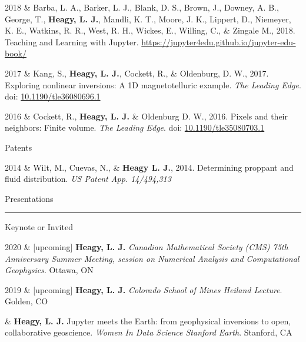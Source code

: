 \documentclass[a4paper, 11pt]{article}
\newcommand{\doi}[1]{doi: \href{https://doi.org/#1}{#1}}
\newcommand{\heading}[1]{
    \begin{minipage}[t]{\textwidth}
    \vspace{0.05cm}
    {\LARGE #1}\\
    \vspace{-0.24cm}
    \hrule
    \end{minipage}
    \vspace{0.05cm}

}
\newcommand{\subheading}[1]{
    \vspace{0.4cm}
    {\Large #1}\\
    \vspace{-0.2cm}
}
\begin{document}
\begin{entryright}
2018 & Barba, L. A., Barker, L. J., Blank, D. S., Brown, J., Downey, A. B., George, T., \textbf{Heagy, L. J.},  Mandli, K. T., Moore, J. K., Lippert, D.,  Niemeyer, K. E., Watkins, R. R., West, R. H., Wickes, E., Willing, C., \& Zingale M., 2018. Teaching and Learning with Jupyter. \href{https://jupyter4edu.github.io/jupyter-edu-book/}{https://jupyter4edu.github.io/jupyter-edu-book/}
\end{entryright}

\begin{entryright}
2017 & Kang, S., \textbf{Heagy, L. J.}, Cockett, R., \& Oldenburg, D. W., 2017. Exploring nonlinear inversions: A 1D magnetotelluric example. \emph{The Leading Edge}. \doi{10.1190/tle36080696.1}
\end{entryright}

\begin{entryright}
2016 & Cockett, R., \textbf{Heagy, L. J.} \& Oldenburg D. W., 2016. Pixels and their neighbors: Finite volume. \emph{The Leading Edge}. \doi{10.1190/tle35080703.1}
\end{entryright}

\subheading{Patents}

\begin{entryright}
2014 & Wilt, M., Cuevas, N., \& \textbf{Heagy L. J.}, 2014. Determining proppant and fluid distribution. \emph{US Patent App. 14/494,313}
\end{entryright}



\heading{Presentations}

\subheading{Keynote or Invited}


\begin{entryright}
2020 & [upcoming] \textbf{Heagy, L. J.} \emph{Canadian Mathematical Society (CMS) 75th Anniversary Summer Meeting, session on Numerical Analysis and
Computational Geophysics}. Ottawa, ON
\end{entryright}


\begin{entryright}
2019 & [upcoming] \textbf{Heagy, L. J.} \emph{Colorado School of Mines Heiland Lecture}. Golden, CO
\end{entryright}

\begin{entryright}
& \textbf{Heagy, L. J.} Jupyter meets the Earth: from geophysical inversions to open, collaborative geoscience. \emph{Women In Data Science \@ Stanford Earth}. Stanford, CA
\end{entryright}
\end{document}

